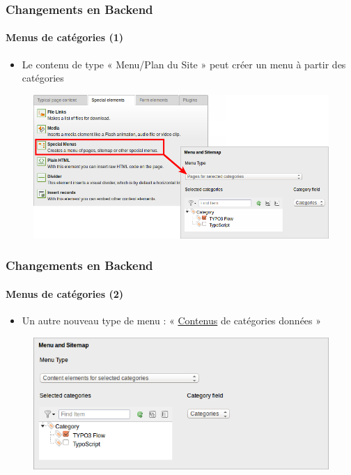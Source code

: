
\begin{frame}[fragile]
	\frametitle{Changements en Backend}
	\framesubtitle{Menus de catégories (1)}

	\begin{itemize}
		\item Le contenu de type « Menu/Plan du Site » peut créer un menu à partir des catégories
	\end{itemize}

	\begin{figure}
		\includegraphics[width=0.8\linewidth]{Images/BackendChanges/CategoryBasedMenus.png}
	\end{figure}

\end{frame}


\begin{frame}[fragile]
	\frametitle{Changements en Backend}
	\framesubtitle{Menus de catégories (2)}

	\begin{itemize}
		\item Un autre nouveau type de menu : « \underline{Contenus} de catégories données »
	\end{itemize}

	\begin{figure}
		\includegraphics[width=0.6\linewidth]{Images/BackendChanges/ContentElementsForSelectedCategories.png}
	\end{figure}

\end{frame}

